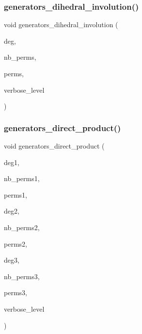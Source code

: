 \subsubsection{\texorpdfstring{generators\+\_\+dihedral\+\_\+involution()}{generators\_dihedral\_involution()}}
{\footnotesize\ttfamily void generators\+\_\+dihedral\+\_\+involution (\begin{DoxyParamCaption}\item[{\mbox{\hyperlink{galois_8h_a09fddde158a3a20bd2dcadb609de11dc}{I\+NT}}}]{deg,  }\item[{\mbox{\hyperlink{galois_8h_a09fddde158a3a20bd2dcadb609de11dc}{I\+NT}} \&}]{nb\+\_\+perms,  }\item[{\mbox{\hyperlink{galois_8h_a09fddde158a3a20bd2dcadb609de11dc}{I\+NT}} $\ast$\&}]{perms,  }\item[{\mbox{\hyperlink{galois_8h_a09fddde158a3a20bd2dcadb609de11dc}{I\+NT}}}]{verbose\+\_\+level }\end{DoxyParamCaption})}

\mbox{\label{group__generators_8_c_a07dada5c255d34b118ab08b5ea11fb7e}} 
\subsubsection{\texorpdfstring{generators\+\_\+direct\+\_\+product()}{generators\_direct\_product()}}
{\footnotesize\ttfamily void generators\+\_\+direct\+\_\+product (\begin{DoxyParamCaption}\item[{\mbox{\hyperlink{galois_8h_a09fddde158a3a20bd2dcadb609de11dc}{I\+NT}}}]{deg1,  }\item[{\mbox{\hyperlink{galois_8h_a09fddde158a3a20bd2dcadb609de11dc}{I\+NT}}}]{nb\+\_\+perms1,  }\item[{\mbox{\hyperlink{galois_8h_a09fddde158a3a20bd2dcadb609de11dc}{I\+NT}} $\ast$}]{perms1,  }\item[{\mbox{\hyperlink{galois_8h_a09fddde158a3a20bd2dcadb609de11dc}{I\+NT}}}]{deg2,  }\item[{\mbox{\hyperlink{galois_8h_a09fddde158a3a20bd2dcadb609de11dc}{I\+NT}}}]{nb\+\_\+perms2,  }\item[{\mbox{\hyperlink{galois_8h_a09fddde158a3a20bd2dcadb609de11dc}{I\+NT}} $\ast$}]{perms2,  }\item[{\mbox{\hyperlink{galois_8h_a09fddde158a3a20bd2dcadb609de11dc}{I\+NT}} \&}]{deg3,  }\item[{\mbox{\hyperlink{galois_8h_a09fddde158a3a20bd2dcadb609de11dc}{I\+NT}} \&}]{nb\+\_\+perms3,  }\item[{\mbox{\hyperlink{galois_8h_a09fddde158a3a20bd2dcadb609de11dc}{I\+NT}} $\ast$\&}]{perms3,  }\item[{\mbox{\hyperlink{galois_8h_a09fddde158a3a20bd2dcadb609de11dc}{I\+NT}}}]{verbose\+\_\+level }\end{DoxyParamCaption})}

